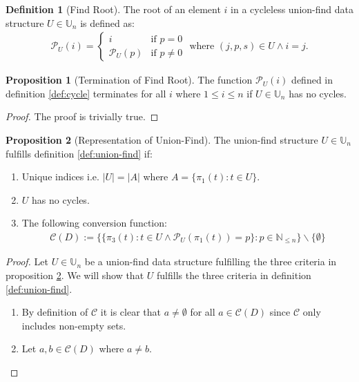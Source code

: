 \documentclass[a4paper,12pt]{article}
\theoremstyle{definition}
\newtheorem{definition}{Definition}[section]
\newtheorem{proposition}{Proposition}[section]
\begin{document}
\begin{definition}[Find Root]
    The root of an element $i$ in a cycleless union-find data structure $U \in \mathbb{U}_n$ is defined as:
    \begin{align*}
        \mathcal{P}_U(i) = 
        \begin{cases}
            i & \text{if } p = 0 \\
            \mathcal{P}_U(p) & \text{if } p \neq 0
        \end{cases} \text{ where } (j, p, s) \in U \land i = j.
    \end{align*}
\end{definition}

\begin{proposition}[Termination of Find Root]
    The function $\mathcal{P}_U(i)$ defined in definition \ref{def:cycle} terminates for all $i$ where $1 \leq i \leq n$ if $U \in \mathbb{U}_n$ has no cycles.
\end{proposition}
\begin{proof}
    The proof is trivially true.
\end{proof}

\begin{proposition}[Representation of Union-Find]\label{def:representation-union-find}
    The union-find structure $U \in \mathbb{U}_n$ fulfills definition \ref{def:union-find} if:
    \begin{enumerate}
        \item Unique indices i.e. $|U| = |A|$ where $A = \{\pi_1(t) : t \in U\}$.
        \item $U$ has no cycles.
        \item The following conversion function:
        \begin{align*}
            \mathcal{C}(D) := \{\{\pi_3(t) : t \in U \land \mathcal{P}_U(\pi_1(t)) = p \} : p \in \mathbb{N}_{\leq n}\} \backslash \{\emptyset\}
        \end{align*}
    \end{enumerate}
\end{proposition}
\begin{proof}
    Let $U \in \mathbb{U}_n$ be a union-find data structure fulfilling the three criteria in proposition \ref{def:representation-union-find}. We will show that $U$ fulfills the three criteria in definition \ref{def:union-find}.

    \begin{enumerate}
        \item By definition of $\mathcal{C}$ it is clear that $a \neq \emptyset$ for all $a \in \mathcal{C}(D)$ since $\mathcal{C}$ only includes non-empty sets.
        \item Let $a, b \in \mathcal{C}(D)$ where $a \neq b$. 
    \end{enumerate}
\end{proof}
\end{document}
